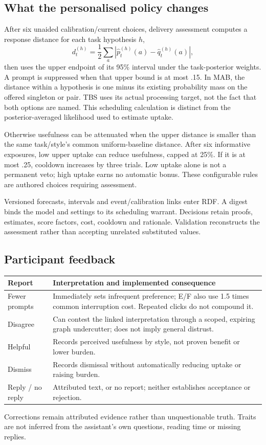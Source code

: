\documentclass[11pt,a4paper]{article}
\begin{document}
\subsection{What the personalised policy changes}
After six unaided calibration/current choices, delivery assessment computes a response distance for each task hypothesis $h$,
\[
 d_t^{(h)}=\frac12\sum_a\left|\widehat p_t^{(h)}(a)-\widehat q_t^{(h)}(a)\right|,
\]
then uses the upper endpoint of its 95\% interval under the task-posterior weights. A prompt is suppressed when that upper bound is at most .15. In MAB, the distance within a hypothesis is one minus its existing probability mass on the offered singleton or pair. TBS uses its actual processing target, not the fact that both options are named. This scheduling calculation is distinct from the posterior-averaged likelihood used to estimate uptake.

Otherwise usefulness can be attenuated when the upper distance is smaller than the same task/style's common uniform-baseline distance. After six informative exposures, low upper uptake can reduce usefulness, capped at 25\%. If it is at most .25, cooldown increases by three trials. Low uptake alone is not a permanent veto; high uptake earns no automatic bonus. These configurable rules are authored choices requiring assessment.

Versioned forecasts, intervals and event/calibration links enter RDF. A digest binds the model and settings to its scheduling warrant. Decisions retain proofs, estimates, score factors, cost, cooldown and rationale. Validation reconstructs the assessment rather than accepting unrelated substituted values.

\subsection{Participant feedback}
\begin{center}
\small
\begin{tabularx}{\linewidth}{@{}lY@{}}
\toprule
Report & Interpretation and implemented consequence\\
\midrule
Fewer prompts & Immediately sets infrequent preference; E/F also use 1.5 times common interruption cost. Repeated clicks do not compound it.\\
Disagree & Can contest the linked interpretation through a scoped, expiring graph undercutter; does not imply general distrust.\\
Helpful & Records perceived usefulness by style, not proven benefit or lower burden.\\
Dismiss & Records dismissal without automatically reducing uptake or raising burden.\\
Reply / no reply & Attributed text, or no report; neither establishes acceptance or rejection.\\
\bottomrule
\end{tabularx}
\end{center}
Corrections remain attributed evidence rather than unquestionable truth. Traits are not inferred from the assistant's own questions, reading time or missing replies.
\end{document}
